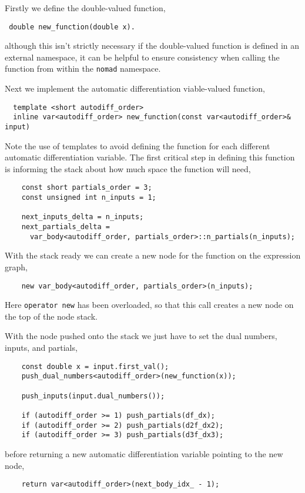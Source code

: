 Firstly we define the double-valued function,
%
\begin{verbatim}
 double new_function(double x).
\end{verbatim}
%
although this isn't strictly necessary if the double-valued function is defined
in an external namespace, it can be helpful to ensure consistency when
calling the function from within the \verb|nomad| namespace.

Next we implement the automatic differentiation viable-valued function,
%
\begin{verbatim}
  template <short autodiff_order>
  inline var<autodiff_order> new_function(const var<autodiff_order>& input)
\end{verbatim}
%
Note the use of templates to avoid defining the function for each different
automatic differentiation variable.  The first critical step in defining this
function is informing the stack about how much space the function will need,
%
\begin{verbatim}
    const short partials_order = 3;
    const unsigned int n_inputs = 1;
    
    next_inputs_delta = n_inputs;
    next_partials_delta =
      var_body<autodiff_order, partials_order>::n_partials(n_inputs);
\end{verbatim}
%
With the stack ready we can create a new node for the function on the
expression graph,
%
\begin{verbatim}
    new var_body<autodiff_order, partials_order>(n_inputs);
\end{verbatim}
%
Here \verb|operator new| has been overloaded, so that this call creates
a new node on the top of the node stack.

With the node pushed onto the stack we just have to set the dual numbers,
inputs, and partials,
%
\begin{verbatim}
    const double x = input.first_val();
    push_dual_numbers<autodiff_order>(new_function(x));
    
    push_inputs(input.dual_numbers());
    
    if (autodiff_order >= 1) push_partials(df_dx);
    if (autodiff_order >= 2) push_partials(d2f_dx2);
    if (autodiff_order >= 3) push_partials(d3f_dx3);
\end{verbatim}
%
before returning a new automatic differentiation variable pointing to the new
node,
%
\begin{verbatim}
    return var<autodiff_order>(next_body_idx_ - 1);
\end{verbatim}

